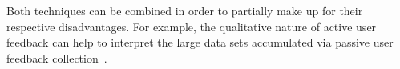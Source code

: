 Both techniques can be combined in order to partially make up for their respective disadvantages.
For example, the qualitative nature of active user feedback can help to interpret the large data sets accumulated via passive user feedback collection~\cite{Kelly:2003:IFI:959258.959260}.
%
%
%
%
%
%
%
%
